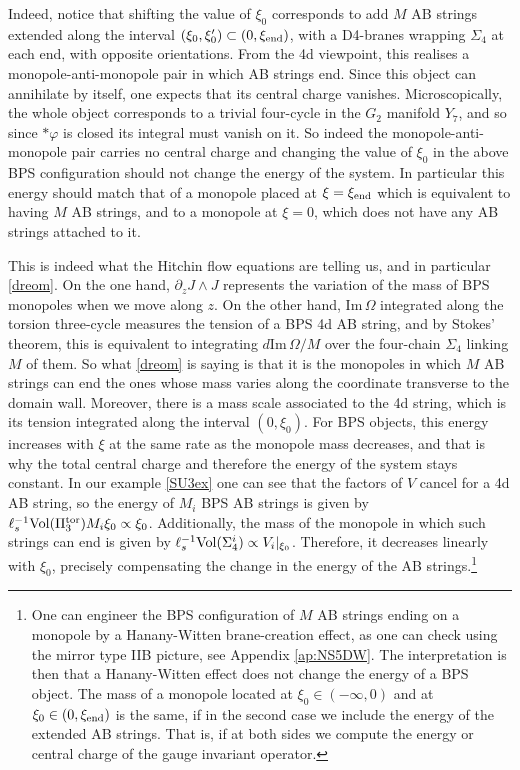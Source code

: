 \documentclass[11pt]{article}
\def\im{\mbox{Im}\, }
\def\p {{\partial}}
\begin{document}
Indeed, notice that shifting the value of $\xi_0$ corresponds to add $M$ AB strings extended along the interval $(\xi_0, \xi_0') \subset (0,\xi_{\rm end})$, with a D4-branes wrapping $\Sigma_4$ at each end, with opposite orientations. From the 4d viewpoint, this realises a monopole-anti-monopole pair in which AB strings end. Since this object can annihilate by itself, one expects that its central charge vanishes. Microscopically, the whole object corresponds to a trivial four-cycle in the $G_2$ manifold $Y_7$, and so since $*\varphi$ is closed its integral must vanish on it. So indeed the monopole-anti-monopole pair carries no central charge and changing the value of $\xi_0$ in the above BPS configuration should not change the energy of the system. In particular this energy should match that of a monopole placed at $\xi = \xi_{\rm end}$ which is equivalent to having $M$ AB strings, and to a monopole at $\xi =0$, which does not have any AB strings attached to it. 

This is indeed what the Hitchin flow equations are telling us, and in particular \eqref{dreom}. On the one hand, $\p_z J \wedge J$ represents the variation of the mass of BPS monopoles  when we move along $z$. On the other hand, ${\im \Omega}$ integrated along the torsion three-cycle measures the tension of a BPS 4d AB string, and by Stokes' theorem, this is equivalent to integrating ${d \im \Omega/M}$ over the four-chain $\Sigma_4$ linking $M$ of them. So what \eqref{dreom} is saying is that it is the monopoles in which $M$ AB strings can end the ones whose mass varies along the coordinate transverse to the domain wall. Moreover, there is a mass scale associated to the 4d string, which is its tension integrated along the interval $(0, \xi_0)$. For BPS objects, this energy increases with $\xi$ at the same rate as the monopole mass decreases, and that is why the total central charge and therefore the energy of the system stays constant. In our example \eqref{SU3ex} one can see that the factors of $V$ cancel for a 4d AB string, so the energy of $M_i$ BPS AB strings is given by $\ell_s^{-1} {\rm Vol}(\Pi_3^{\rm tor}) M_i \xi_0 \propto \xi_0 $. Additionally, the mass of the monopole in which such strings can end is given by $\ell_s^{-1} {\rm Vol}(\Sigma_4^i) \propto V_i|_{\xi_0}$. Therefore, it decreases linearly with $\xi_0$, precisely compensating the change in the energy of the AB strings.\footnote{One can engineer the BPS configuration of $M$ AB strings ending on a monopole by a Hanany-Witten brane-creation effect, as one can check using the mirror type IIB picture, see Appendix \ref{ap:NS5DW}. The interpretation is then that a Hanany-Witten effect does not change the energy of a BPS object. The mass of a monopole located at $\xi_0 \in (-\infty, 0)$ and at $\xi_0 \in (0,\xi_{\rm end})$ is the same, if in the second case we include the energy of the extended AB strings. That is, if at both sides we compute the energy or central charge of the gauge invariant operator.}
\end{document}
